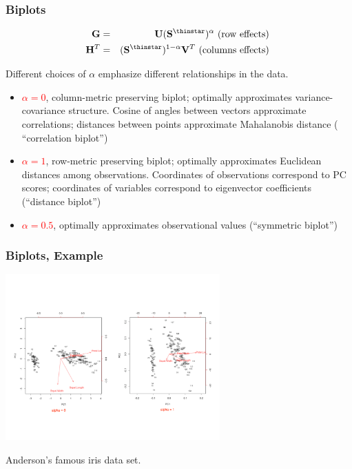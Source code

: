 \documentclass{beamer}
\newcommand{\Mtx}[1]{\ensuremath{\mathbf{#1}}}
\newcommand{\Red}[1]{\textcolor{red}{#1}}
\begin{document}
\begin{frame}
  \frametitle{Biplots}

\begin{eqnarray*}
\Mtx{G} &=& \Mtx{U}(\Mtx{S}^{\thinstar})^{\alpha} \text{ (row effects) } \\
\Mtx{H}^T &=& (\Mtx{S}^{\thinstar})^{1-\alpha} \Mtx{V}^T \text{ (columns effects) }
\end{eqnarray*}

Different choices of $\alpha$ emphasize different relationships in the data.

\begin{itemize}
\item \Red{$\alpha = 0$}, column-metric preserving biplot; optimally approximates variance-covariance structure. Cosine of angles between vectors approximate correlations; distances between points approximate Mahalanobis distance ( ``correlation biplot'')
\item \Red{$\alpha = 1$}, row-metric preserving biplot; optimally approximates Euclidean distances among observations. Coordinates of observations correspond to PC scores; coordinates of variables correspond to eigenvector coefficients (``distance biplot'')
\item \Red{$\alpha = 0.5$},  optimally approximates observational values (``symmetric biplot'')
\end{itemize}

\end{frame}


\begin{frame}
  \frametitle{Biplots, Example}


\begin{center}
\includegraphics[height=2.5in]{iris-biplots2}

{\footnotesize Anderson's famous iris data set.}
\end{center}


\end{frame}
\end{document}
